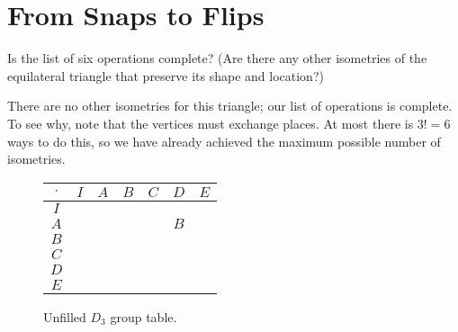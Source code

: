 \documentclass[../key.tex]{subfiles}
\begin{document}
\section{From Snaps to Flips}

\begin{outer_problem}[start=1]
\item Is the list of six operations complete? (Are there any other isometries of the equilateral triangle that preserve its shape and location?)
\end{outer_problem}

\noindent There are no other isometries for this triangle; our list of operations is complete. To see why, note that the vertices must exchange places. At most there is $3!=6$ ways to do this, so we have already achieved the maximum possible number of isometries.

\begin{figure}[h]
	\begin{center}
		\begin{minipage}[b]{\textwidth}
			\centering
			\begin{tabular}{c|cccccc}
				\hline
				$\cdot$ & $I$ & $A$ & $B$ & $C$ & $D$ & $E$ \\ \hline
				\rowcolor{light-gray}
				$I$    &   &   &   &   &   &   \\ 
				$A$    &   &   &   &   & $B$  &   \\ 
				\rowcolor{light-gray}
				$B$    &   &   &   &   &   &   \\ 
				$C$    &   &   &   &   &   &   \\
				\rowcolor{light-gray} 
				$D$    &   &   &   &   &   &   \\ 
				$E$    &   &   &   &   &   &   \\ \hline
			\end{tabular}
			\vspace*{0.5\baselineskip}
		\end{minipage}
	\end{center}
	\vspace*{-2\baselineskip}
	\begin{center}
		\begin{minipage}[t]{\textwidth}
			\caption{Unfilled $D_3$ group table.}
			\label{fig:sbstable}
		\end{minipage}
	\end{center}
	\vspace*{-2\baselineskip}
\end{figure}
\end{document}
